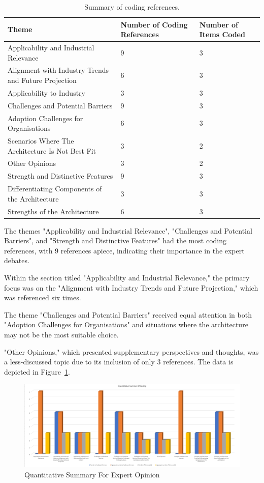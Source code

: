 \documentclass[journal]{IEEEtran}
\begin{document}
\begin{table}
  \centering
  \caption{Summary of coding references.}
  \begin{tabular}{p{}p{}p{}}
  \toprule
  Theme & Number of Coding References & Number of Items Coded \\
  \midrule
  Applicability and Industrial Relevance & 9 & 3 \\
  Alignment with Industry Trends and Future Projection & 6 & 3 \\
  Applicability to Industry & 3 & 3 \\
  Challenges and Potential Barriers & 9 & 3 \\
  Adoption Challenges for Organisations & 6 & 3 \\
  Scenarios Where The Architecture Is Not Best Fit & 3 & 2 \\
  Other Opinions & 3 & 2 \\
  Strength and Distinctive Features & 9 & 3 \\
  Differentiating Components of the Architecture & 3 & 3 \\
  Strengths of the Architecture & 6 & 3 \\
  \bottomrule
  \end{tabular}
  \label{tab:coding_summary}
\end{table}


The themes "Applicability and Industrial Relevance", "Challenges and Potential Barriers", and "Strength and Distinctive Features" had the most coding references, with 9 references apiece, indicating their importance in the expert debates.

Within the section titled "Applicability and Industrial Relevance," the primary focus was on the "Alignment with Industry Trends and Future Projection," which was referenced six times.

The theme "Challenges and Potential Barriers" received equal attention in both "Adoption Challenges for Organisations" and situations where the architecture may not be the most suitable choice.

"Other Opinions," which presented supplementary perspectives and thoughts, was a less-discussed topic due to its inclusion of only 3 references. The data is depicted in Figure~\ref{fig:quantitativeSummaryForExpertOpinion}.



\begin{figure}[h]
  \centering
  \includegraphics[width=\textwidth]{images/Quantitative-Summary-For-Codes.png}
  \caption{Quantitative Summary For Expert Opinion}
  \label{fig:quantitativeSummaryForExpertOpinion}
\end{figure}
\end{document}
